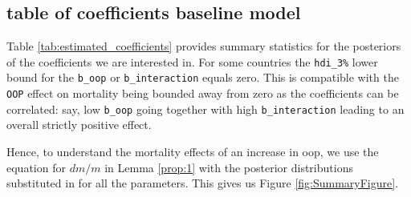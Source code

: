\documentclass[a4paper,12pt]{article}
\begin{document}
\subsection{table of coefficients baseline model}
\label{sec:org3814800}

Table \ref{tab:estimated_coefficients} provides summary statistics for the posteriors of the coefficients we are interested in. For some countries the \texttt{hdi\_3\%} lower bound for the \texttt{b\_oop} or \texttt{b\_interaction} equals zero. This is compatible with the \texttt{OOP} effect on mortality being bounded away from zero as the coefficients can be correlated: say, low \texttt{b\_oop} going together with high \texttt{b\_interaction} leading to an overall strictly positive effect.

Hence, to understand the mortality effects of an increase in oop, we use the equation for \(dm/m\) in Lemma \ref{prop:1} with the posterior distributions substituted in for all the parameters. This gives us Figure \ref{fig:SummaryFigure}.
\end{document}
